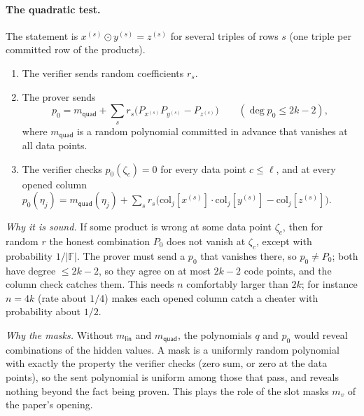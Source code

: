 \documentclass[11pt,a4paper]{article}
\newcommand{\F}{\mathbb{F}}
\theoremstyle{definition}
\theoremstyle{plain}
\begin{document}
\paragraph{The quadratic test.} The statement is $x^{(s)}\odot y^{(s)}=z^{(s)}$ for several triples
of rows $s$ (one triple per committed row of the products).
\begin{enumerate}[leftmargin=1.5em,itemsep=1pt]
\item The verifier sends random coefficients $r_s$.
\item The prover sends
  \[
    p_0=m_{\mathsf{quad}}+\sum_sr_s\bigl(P_{x^{(s)}}P_{y^{(s)}}-P_{z^{(s)}}\bigr)\qquad(\deg p_0\le 2k-2),
  \]
  where $m_{\mathsf{quad}}$ is a random polynomial committed in advance that vanishes at all data
  points.
\item The verifier checks $p_0(\zeta_c)=0$ for every data point $c\le\ell$, and at every opened column
  $p_0(\eta_j)=m_{\mathsf{quad}}(\eta_j)+\sum_sr_s\bigl(\mathrm{col}_j[x^{(s)}]\cdot\mathrm{col}_j[y^{(s)}]-\mathrm{col}_j[z^{(s)}]\bigr)$.
\end{enumerate}
\emph{Why it is sound.} If some product is wrong at some data point $\zeta_c$, then for random $r$ the
honest combination $P_0$ does not vanish at $\zeta_c$, except with probability $1/|\F|$. The prover
must send a $p_0$ that vanishes there, so $p_0\ne P_0$; both have degree $\le2k-2$, so they agree on
at most $2k-2$ code points, and the column check catches them. This needs $n$ comfortably larger than
$2k$; for instance $n=4k$ (rate about $1/4$) makes each opened column catch a cheater with probability
about $1/2$.

\emph{Why the masks.} Without $m_{\mathsf{lin}}$ and $m_{\mathsf{quad}}$, the polynomials $q$ and $p_0$
would reveal combinations of the hidden values. A mask is a uniformly random polynomial with exactly
the property the verifier checks (zero sum, or zero at the data points), so the sent polynomial is
uniform among those that pass, and reveals nothing beyond the fact being proven. This plays the role
of the slot masks $m_v$ of the paper's opening.
\end{document}
